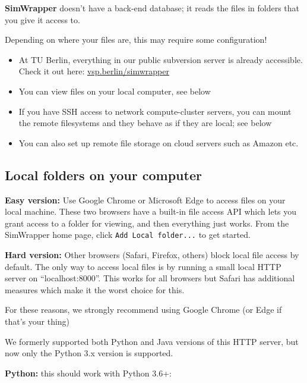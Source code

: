 \textbf{SimWrapper} doesn't have a back-end database; it reads the files
in folders that you give it access to.

Depending on where your files are, this may require some configuration!

\begin{itemize}
\tightlist
\item
  At TU Berlin, everything in our public subversion server is already
  accessible. Check it out here:
  \href{https://vsp.berlin/simwrapper}{vsp.berlin/simwrapper}
\item
  You can view files on your local computer, see below
\item
  If you have SSH access to network compute-cluster servers, you can
  mount the remote filesystems and they behave as if they are local; see
  below
\item
  You can also set up remote file storage on cloud servers such as
  Amazon etc.
\end{itemize}

\hypertarget{local-folders-on-your-computer}{%
\subsection{Local folders on your
computer}\label{local-folders-on-your-computer}}

\textbf{Easy version:} Use Google Chrome or Microsoft Edge to access
files on your local machine. These two browsers have a built-in file
access API which lets you grant access to a folder for viewing, and then
everything just works. From the SimWrapper home page, click
\texttt{Add\ Local\ folder...} to get started.

\textbf{Hard version:} Other browsers (Safari, Firefox, others) block
local file access by default. The only way to access local files is by
running a small local HTTP server on ``localhost:8000''. This works for
all browsers but Safari has additional measures which make it the worst
choice for this.

For these reasons, we strongly recommend using Google Chrome (or Edge if
that's your thing)

We formerly supported both Python and Java versions of this HTTP server,
but now only the Python 3.x version is supported.

\textbf{Python:} this should work with Python 3.6+:


